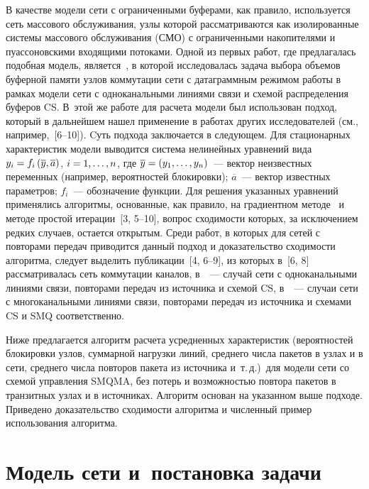\begin{multicols}{2}
     В качестве модели сети с ограниченными буферами, как правило, 
используется сеть массового обслуживания, узлы которой рассматриваются 
как изолированные системы массового обслуживания (СМО) 
с ограниченными накопителями и пуассоновскими 
входящими потоками. Одной из первых работ, где предлагалась подобная 
модель, является~\cite{5aga}, в которой исследовалась задача выбора 
объемов буферной памяти узлов коммутации сети с датаграммным режимом 
работы в рамках модели сети с одноканальными линиями связи и схемой 
распределения буферов CS. В~этой же работе для расчета модели был 
использован подход, который в дальнейшем нашел применение в работах 
других исследователей (см., например,~[6--10]). 
Cуть подхода заключается в следующем. Для стационарных характеристик 
модели выводится система нелинейных уравнений вида 
$y_i\hm=f_i\left(\overline{y},\overline{a}\right)$, $i\hm=1,\ldots , n$, где 
$\overline{y}\hm=\left(y_1, \ldots ,y_n\right)$~--- вектор неизвестных переменных 
(например, вероятностей блокировки); $\overline{a}$~--- вектор известных 
па\-ра\-мет\-ров; $f_i$~--- обозначение функции. Для решения указанных 
уравнений применялись алгоритмы, основанные, как правило, на 
градиентном методе~\cite{4aga, 5aga} и методе простой итерации~[3, 5--10], 
вопрос сходимости которых, за 
исключением редких случаев, остается открытым. Среди работ, в которых 
для сетей с повторами передач приводится данный подход и доказательство 
сходимости алгоритма, следует выделить публикации~[4, 6--9], 
из которых в~[6, 8] рассматривалась сеть 
коммутации каналов, в~\cite{4aga}~--- случай сети с одноканальными 
линиями связи, повторами передач из источника и схемой CS, в~\cite{8aga, 10aga}~--- 
случаи сети с многоканальными линиями связи, повторами 
передач из источника и схемами CS и SMQ соответственно. 
     
     Ниже предлагается алгоритм расчета усредненных характеристик 
(вероятностей блокировки узлов, суммарной нагрузки линий, среднего числа 
пакетов в узлах и в сети, среднего числа повторов пакета из источника 
и~т.\,д.)\ для модели сети со схемой управления SMQMA, без потерь и 
возможностью повтора пакетов в транзитных узлах и в источниках. 
Алгоритм основан на указанном выше подходе. Приведено доказательство 
сходимости алгоритма и численный пример использования алгоритма. 
     
\section{Модель сети и~постановка задачи}
     

\end{multicols}
